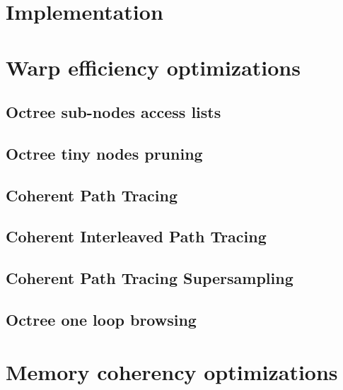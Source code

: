 \documentclass[10pt,twocolumn,a4paper]{article}
\begin{document}
\section{Implementation}


\section{Warp efficiency optimizations}

\subsection{Octree sub-nodes access lists}


\subsection{Octree tiny nodes pruning}


\subsection{Coherent Path Tracing}


\subsection{Coherent Interleaved Path Tracing}


\subsection{Coherent Path Tracing Supersampling}


\subsection{Octree one loop browsing}



\section{Memory coherency optimizations}
\end{document}
